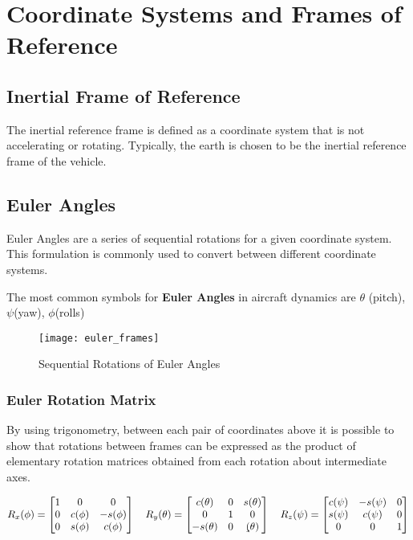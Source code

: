 \section{Coordinate Systems and Frames of Reference}

\subsection{Inertial Frame of Reference}
The inertial reference frame is defined as a coordinate system that is not accelerating or rotating. Typically, the earth is chosen to be the inertial reference frame of the vehicle.


\subsection{Euler Angles}

Euler Angles are a series of sequential rotations for a given coordinate system. This formulation is commonly used to convert between different coordinate systems. \newline

The most common symbols for \textbf{Euler Angles} in aircraft dynamics are $\theta$ (pitch), $\psi$(yaw), $\phi$(rolls)

 \begin{figure}[h]
    \texttt{[image: euler\_frames]}
    \centering
    \label{fig:euler_angles}
    \caption{Sequential Rotations of Euler Angles}
\end{figure}

\subsubsection{Euler Rotation Matrix}

By using trigonometry, between each pair of coordinates above it is possible to show that rotations between frames can be expressed as the product of elementary rotation matrices obtained from each rotation about intermediate axes. 

$$
R_{x}(\phi) = \begin{bmatrix}
    1 & 0 & 0\\ 
    0 & c(\phi) & -s(\phi)\\
    0 & s(\phi) & c(\phi)
\end{bmatrix} \quad
R_{y}(\theta) = \begin{bmatrix}
    c(\theta) & 0 & s(\theta)\\
    0 & 1 & 0\\
    -s(\theta) & 0 & \c(\theta)
\end{bmatrix} \quad
R_{z}(\psi) = \begin{bmatrix}
    c(\psi) & -s(\psi) & 0\\
    s(\psi) & c(\psi) & 0\\
    0 & 0 & 1
\end{bmatrix}  $$ 

